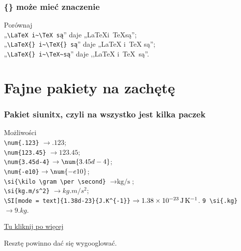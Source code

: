 \documentclass[10pt,t]{beamer}
\begin{document}
\begin{frame}[fragile]
  \frametitle{\{\} może mieć znaczenie}

  Porównaj \\
  „\verb+\LaTeX i~\TeX są+” daje „\LaTeX i~\TeX są”; \\
  „\verb+\LaTeX{} i~\TeX{} są+” daje „\LaTeX{} i~\TeX{} są”; \\
  „\verb+\LaTeX{} i~\TeX~są+'' daje ,,\LaTeX{} i~\TeX~są”.


\end{frame}










\section{Fajne pakiety na zachętę}



\begin{frame}[fragile]
  \frametitle{Pakiet siunitx, czyli na wszystko jest kilka paczek}


  Możliwości \\
  \verb+\num{.123}+ $\to \num{.123}$; \\
  \verb+\num{123.45}+ $\to \num{123.45}$; \\
  \verb+\num{3.45d-4}+ $\to \num{3.45d-4}$; \\
  \verb+\num{-e10}+ $\to \num{-e10}$; \\
  \verb+\si{\kilo \gram \per \second}+ $\to \si{\kilo \gram \per \second}$; \\
  \verb+\si{kg.m/s^2}+ $\to \si{kg.m/s^{ 2 }}$; \\
  \verb+\SI[mode = text]{1.38d-23}{J.K^{-1}}+
  $\to \SI[mode = text]{1.38d-23}{J.K^{-1}}$. \verb+9 \si{.kg}+
  $\to 9 \si{.kg}$.

  \href{ftp://ftp.dante.de/tex-archive/macros/latex/exptl/siunitx/siunitx.pdf}
  {Tu kliknij po więcej}

  Resztę powinno dać się {\color{magenta} wygooglować}.

\end{frame}
\end{document}
